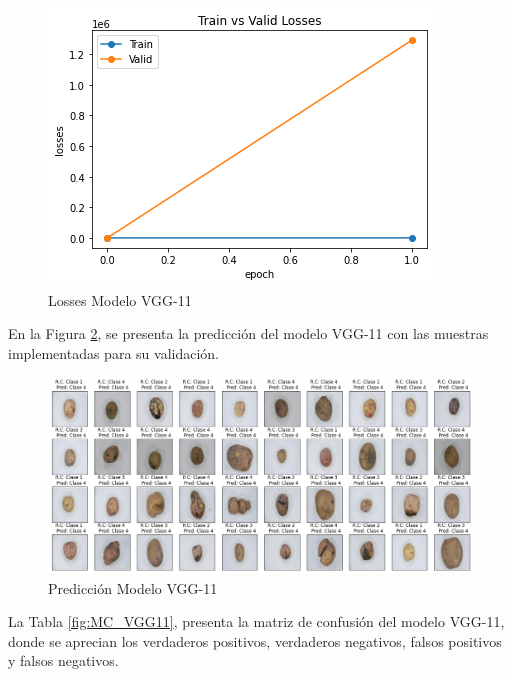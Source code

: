 \begin{figure}[ht]
	\centering
	\includegraphics[scale=0.5]{Figs/106.png}
	\caption{Losses Modelo VGG-11}
	\label{fig:loses_VGG11}
\end{figure}

En la Figura \ref{fig:Pre_VGG11}, se presenta la predicción del modelo VGG-11 con las muestras implementadas para su validación.

\begin{figure}[ht]
	\centering
	\includegraphics[scale=0.4]{Figs/107.png}
	\caption{Predicción Modelo VGG-11}
	\label{fig:Pre_VGG11}
\end{figure}

La Tabla \ref{fig:MC_VGG11}, presenta la matriz de confusión del modelo VGG-11, donde se aprecian los verdaderos positivos, verdaderos negativos, falsos positivos y falsos negativos.

